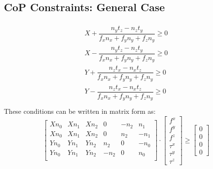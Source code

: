 \subsection{CoP Constraints: General Case}
\begin{align}
\begin{split}
X + \dfrac{n_yt_z - n_zt_y}{f_xn_x+f_yn_y+f_zn_y} \geq 0 \\
X - \dfrac{n_yt_z - n_zt_y}{f_xn_x+f_yn_y+f_zn_y} \geq 0 \\
Y + \dfrac{n_zt_x-n_xt_z}{f_xn_x+f_yn_y+f_zn_y} \geq 0 \\
Y - \dfrac{n_zt_x-n_xt_z}{f_xn_x+f_yn_y+f_zn_y} \geq 0 \\
\end{split}
\end{align}
These conditions can be written in matrix form as:  
\begin{equation}
\begin{bmatrix}  
Xn_0 & Xn_1 & Xn_2 & 0 & -n_2 & n_1 \\
Xn_0 & Xn_1 & Xn_2 & 0 & n_2 & -n_1 \\
Yn_0 & Yn_1 & Yn_2 & n_2 & 0 & -n_0 \\
Yn_0 & Yn_1 & Yn_2 & -n_2 & 0 & n_0 \\ \end{bmatrix} \cdot
\begin{bmatrix} f^x \\ f^y \\ f^z \\ \tau^x \\ \tau^y \\ \tau^z \end{bmatrix} \geq
\begin{bmatrix} 0 \\ 0 \\ 0 \\ 0 \end{bmatrix}
\end{equation}


